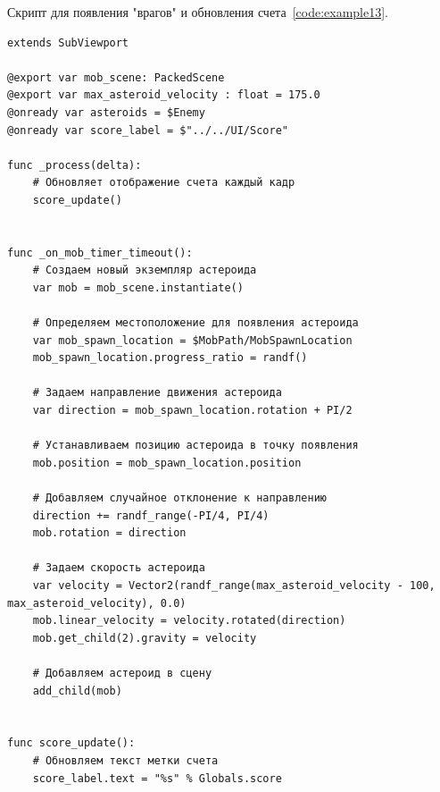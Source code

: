 \label{{subsec:ch02/sec01/sub14}Подраздел 14. Скрипт для появления "врагов" и обновления счета}
Скрипт для появления "врагов" и обновления счета~\ref{code:example13}.
\begin{code}
\vspace{-\baselineskip}\begin{verbatim}
extends SubViewport

@export var mob_scene: PackedScene
@export var max_asteroid_velocity : float = 175.0
@onready var asteroids = $Enemy
@onready var score_label = $"../../UI/Score"

func _process(delta):
    # Обновляет отображение счета каждый кадр
    score_update()


func _on_mob_timer_timeout():
    # Создаем новый экземпляр астероида
    var mob = mob_scene.instantiate()

    # Определяем местоположение для появления астероида
    var mob_spawn_location = $MobPath/MobSpawnLocation
    mob_spawn_location.progress_ratio = randf()

    # Задаем направление движения астероида
    var direction = mob_spawn_location.rotation + PI/2

    # Устанавливаем позицию астероида в точку появления
    mob.position = mob_spawn_location.position

    # Добавляем случайное отклонение к направлению
    direction += randf_range(-PI/4, PI/4)
    mob.rotation = direction

    # Задаем скорость астероида
    var velocity = Vector2(randf_range(max_asteroid_velocity - 100, max_asteroid_velocity), 0.0)
    mob.linear_velocity = velocity.rotated(direction)
    mob.get_child(2).gravity = velocity

    # Добавляем астероид в сцену
    add_child(mob)


func score_update():
    # Обновляем текст метки счета
    score_label.text = "%s" % Globals.score

\end{verbatim}
\end{code}

